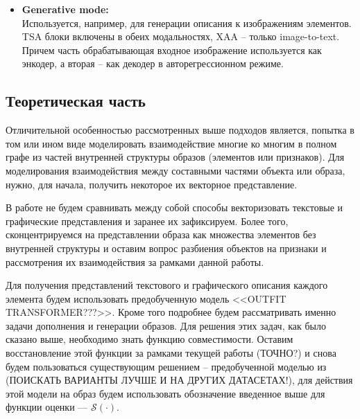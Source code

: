 \documentclass[a4paper,12pt]{article}
\begin{document}
\begin{itemize}
					\item[]\textbf{Generative mode:}\\
					Используется, например, для генерации описания к изображениям элементов. TSA блоки включены в обеих модальностях, XAA -- только image-to-text. Причем часть обрабатывающая входное изображение используется как энкодер, а вторая -- как декодер в авторегрессионном режиме.
				\end{itemize}
			
		\subsection{Теоретическая часть}
				Отличительной особенностью рассмотренных выше подходов является, попытка в том или ином виде моделировать взаимодействие многие ко многим в полном графе из частей внутренней структуры образов (элементов или признаков). Для моделирования взаимодействия между составными частями объекта или образа, нужно, для начала, получить некоторое их векторное представление. 
				
				В работе не будем сравнивать между собой способы векторизовать текстовые и графические представления и заранее их зафиксируем. Более того, сконцентрируемся на представлении образа как множества элементов без внутренней структуры и оставим вопрос разбиения объектов на признаки и рассмотрения их взаимодействия за рамками данной работы.
								
				Для получения представлений текстового и графического описания каждого элемента будем использовать предобученную модель <<OUTFIT TRANSFORMER???>>. Кроме того подробнее будем рассматривать именно задачи дополнения и генерации образов. Для решения этих задач, как было сказано выше, необходимо знать функцию совместимости. Оставим восстановление этой функции за рамками текущей работы (ТОЧНО?) и снова будем пользоваться существующим решением -- предобученной моделью из \cite{https://doi.org/10.48550/arXiv.2204.04812} (ПОИСКАТЬ ВАРИАНТЫ ЛУЧШЕ И НА ДРУГИХ ДАТАСЕТАХ!), для действия этой модели на образ будем использовать обозначение введенное выше для функции оценки --- $\mathcal{S}(\cdot)$.
				
\end{document}
